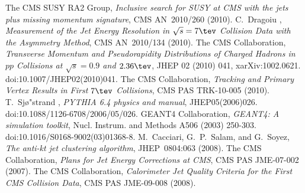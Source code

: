 \documentclass[a4paper]{cmspaper} %
\begin{document}
\begin{thebibliography}{9}
 The CMS SUSY RA2 Group,
  \textit{Inclusive search for SUSY at CMS with the jets plus missing
    momentum signature},
  CMS AN~2010/260 (2010).
 C.~Dragoiu \etal,
  \textit{Measurement of the Jet Energy Resolution in $\sqrt{s}=7\tev$
    Collision Data with the Asymmetry Method},
  CMS AN~2010/134 (2010).
 The CMS Collaboration,
  \textit{Transverse Momentum and Pseudorapidity Distributions of
    Charged Hadrons in $pp$ Collisions at \mbox{$\sqrt{s} = 0.9$} and $2.36\tev$}, JHEP 02 (2010) 041,
 xarXiv:1002.0621. doi:10.1007/JHEP02(2010)041.
 The CMS Collaboration,
  \textit{Tracking and Primary Vertex Results in First $7\tev$ Collisions},
  CMS PAS TRK-10-005 (2010).
 T.~Sj\o"strand \etal,
  \textit{PYTHIA 6.4 physics and manual},
  JHEP05(2006)026. doi:10.1088/1126-6708/2006/05/026.
 GEANT4 Collaboration,
  \textit{GEANT4: A simulation toolkit},
  Nucl. Instrum. and Methods A506 (2003) 250-303. doi:10.1016/S0168-9002(03)01368-8.
 M.~Cacciari, G.~P.~Salam, and G.~Soyez,
  \textit{The anti-kt jet clustering algorithm},
  JHEP~0804:063 (2008).
 The CMS Collaboration,
  \textit{Plans for Jet Energy Corrections at CMS},
  CMS PAS JME-07-002 (2007).
  The CMS Collaboration,
  \textit{Calorimeter Jet Quality Criteria for the First CMS Collision Data},
  CMS PAS JME-09-008 (2008).
\end{thebibliography}
\end{document}
